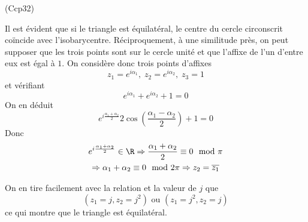 \begin{tiny}(Ccp32)\end{tiny} Il est évident que si le triangle est équilatéral, le centre du cercle circonscrit coïncide avec l'isobarycentre.\newline
Réciproquement, à une similitude près, on peut supposer que les trois points sont sur le cercle unité et que l'affixe de l'un d'entre eux est égal à $1$.\newline
On considère donc trois points d'affixes 
\begin{displaymath}
 z_1=e^{i\alpha_1},\; z_2 = e^{i\alpha_2},\; z_3 = 1 
\end{displaymath}
et vérifiant
\begin{displaymath}
 e^{i\alpha_1} + e^{i\alpha_2} + 1 = 0 
\end{displaymath}
On en déduit
\begin{displaymath}
 e^{i\frac{\alpha_1 + \alpha_2}{2}} 2 \cos\left(\frac{\alpha_1 - \alpha_2}{2} \right)  + 1 = 0 
\end{displaymath}
Donc
\begin{multline*}
 e^{i\frac{\alpha_1 + \alpha_2}{2}}\in \R
\Rightarrow 
\frac{\alpha_1 + \alpha_2}{2} \equiv 0 \mod \pi \\
\Rightarrow  \alpha_1 + \alpha_2 \equiv 0 \mod 2\pi
\Rightarrow z_2 = \overline{z_1}
\end{multline*}

On en tire facilement avec la relation et la valeur de $j$ que
\begin{displaymath}
 \left( z_1=j, z_2 = j^2\right) \text{ ou } \left( z_1=j^2, z_2 = j\right) 
\end{displaymath}
ce qui montre que le triangle est équilatéral.
